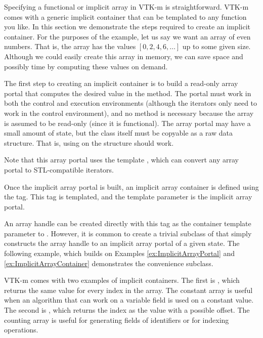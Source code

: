 Specifying a functional or implicit array in VTK-m is straightforward.
VTK-m comes with a generic implicit container that can be templated to any
function you like. In this section we demonstrate the steps required to
create an implicit container. For the purposes of the example, let us say
we want an array of even numbers. That is, the array has the values
$[0,2,4,6,\ldots]$ up to some given size. Although we could easily create
this array in memory, we can save space and possibly time by computing
these values on demand.

The first step to creating an implicit container is to build a read-only
array portal that computes the desired value in the 
method. The portal must work in both the control and execution environments
(although the iterators only need to work in the control environment), and
no  method is necessary because the array is assumed to be
read-only (since it is functional). The array portal may have a small
amount of state, but the class itself must be copyable as a raw data
structure. That is, using  on the structure should work.


Note that this array portal uses the template
, which can convert any array
portal to STL-compatible iterators.

Once the implicit array portal is built, an implicit array container is
defined using the  tag. This tag
is templated, and the template parameter is the implicit array portal.


An array handle can be created directly with this tag as the container
template parameter to . However, it is common to
create a trivial subclass of  that simply constructs
the array handle to an implicit array portal of a given state. The
following example, which builds on Examples \ref{ex:ImplicitArrayPortal}
and \ref{ex:ImplicitArrayContainer} demonstrates the convenience
 subclass.


VTK-m comes with two examples of implicit containers. The first is
, which returns the same value for every
index in the array. The constant array is useful when an algorithm that can
work on a variable field is used on a constant value. The second is
, which returns the index as the value with a
possible offset. The counting array is useful for generating fields of
identifiers or for indexing operations.

